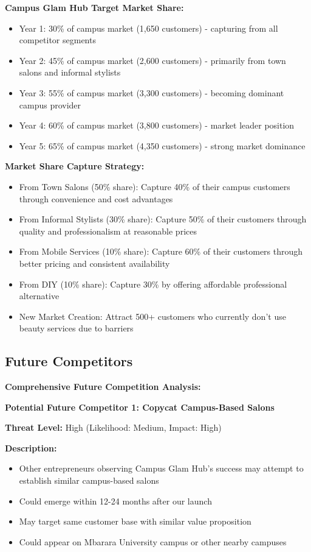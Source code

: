 \documentclass[a4paper,12pt]{article}
\begin{document}
\vspace{1em}

\textbf{Campus Glam Hub Target Market Share:}
\begin{itemize}[leftmargin=2em]
    \item Year 1: 30\% of campus market (1,650 customers) - capturing from all competitor segments
    \item Year 2: 45\% of campus market (2,600 customers) - primarily from town salons and informal stylists
    \item Year 3: 55\% of campus market (3,300 customers) - becoming dominant campus provider
    \item Year 4: 60\% of campus market (3,800 customers) - market leader position
    \item Year 5: 65\% of campus market (4,350 customers) - strong market dominance
\end{itemize}

\textbf{Market Share Capture Strategy:}
\begin{itemize}[leftmargin=2em]
    \item From Town Salons (50\% share): Capture 40\% of their campus customers through convenience and cost advantages
    \item From Informal Stylists (30\% share): Capture 50\% of their customers through quality and professionalism at reasonable prices
    \item From Mobile Services (10\% share): Capture 60\% of their customers through better pricing and consistent availability
    \item From DIY (10\% share): Capture 30\% by offering affordable professional alternative
    \item New Market Creation: Attract 500+ customers who currently don't use beauty services due to barriers
\end{itemize}

\subsection{Future Competitors}

\textbf{Comprehensive Future Competition Analysis:}

\textbf{Potential Future Competitor 1: Copycat Campus-Based Salons}

\textbf{Threat Level:} High (Likelihood: Medium, Impact: High)

\textbf{Description:}
\begin{itemize}[leftmargin=2em]
    \item Other entrepreneurs observing Campus Glam Hub's success may attempt to establish similar campus-based salons
    \item Could emerge within 12-24 months after our launch
    \item May target same customer base with similar value proposition
    \item Could appear on Mbarara University campus or other nearby campuses
\end{itemize}
\end{document}
